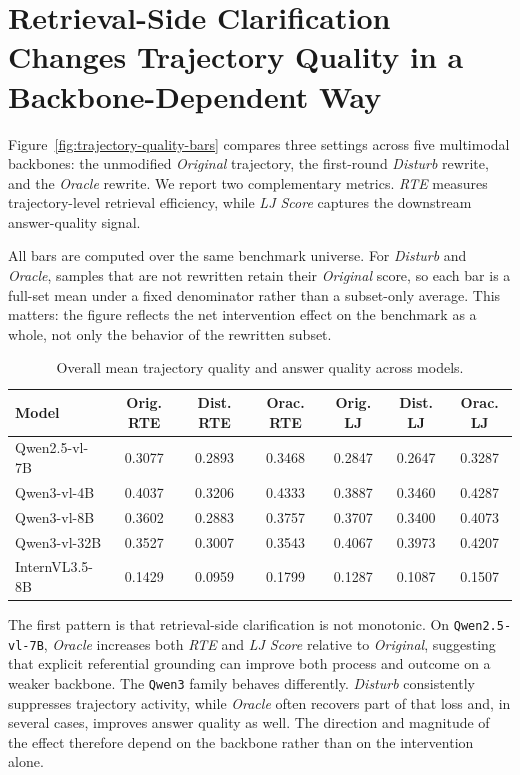 \section{Retrieval-Side Clarification Changes Trajectory Quality in a Backbone-Dependent Way}
\label{sec:bar-charts}

Figure~\ref{fig:trajectory-quality-bars} compares three settings across five multimodal backbones: the unmodified \emph{Original} trajectory, the first-round \emph{Disturb} rewrite, and the \emph{Oracle} rewrite. We report two complementary metrics. \emph{RTE} measures trajectory-level retrieval efficiency, while \emph{LJ Score} captures the downstream answer-quality signal.

All bars are computed over the same benchmark universe. For \emph{Disturb} and \emph{Oracle}, samples that are not rewritten retain their \emph{Original} score, so each bar is a full-set mean under a fixed denominator rather than a subset-only average. This matters: the figure reflects the net intervention effect on the benchmark as a whole, not only the behavior of the rewritten subset.

\begin{table}[t]
    \centering
    \caption{Overall mean trajectory quality and answer quality across models.}
    \label{tab:trajectory-quality-overall}
    \begin{tabular}{lcccccc}
        \toprule
        Model & Orig. RTE & Dist. RTE & Orac. RTE & Orig. LJ & Dist. LJ & Orac. LJ \\
        \midrule
        Qwen2.5-vl-7B   & 0.3077 & 0.2893 & 0.3468 & 0.2847 & 0.2647 & 0.3287 \\
        Qwen3-vl-4B     & 0.4037 & 0.3206 & 0.4333 & 0.3887 & 0.3460 & 0.4287 \\
        Qwen3-vl-8B     & 0.3602 & 0.2883 & 0.3757 & 0.3707 & 0.3400 & 0.4073 \\
        Qwen3-vl-32B    & 0.3527 & 0.3007 & 0.3543 & 0.4067 & 0.3973 & 0.4207 \\
        InternVL3.5-8B  & 0.1429 & 0.0959 & 0.1799 & 0.1287 & 0.1087 & 0.1507 \\
        \bottomrule
    \end{tabular}
\end{table}

The first pattern is that retrieval-side clarification is not monotonic. On \texttt{Qwen2.5-vl-7B}, \emph{Oracle} increases both \emph{RTE} and \emph{LJ Score} relative to \emph{Original}, suggesting that explicit referential grounding can improve both process and outcome on a weaker backbone. The \texttt{Qwen3} family behaves differently. \emph{Disturb} consistently suppresses trajectory activity, while \emph{Oracle} often recovers part of that loss and, in several cases, improves answer quality as well. The direction and magnitude of the effect therefore depend on the backbone rather than on the intervention alone.

